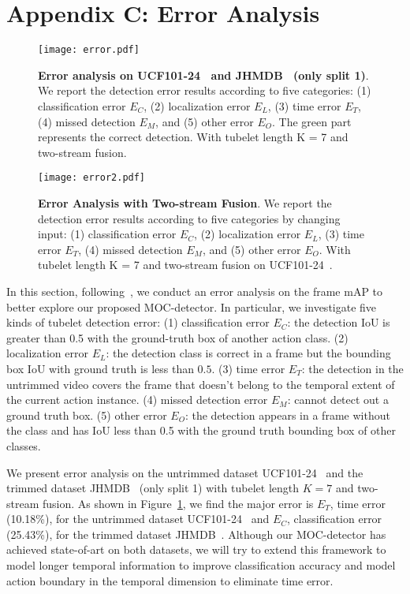 \documentclass[runningheads]{llncs}
\begin{document}
\section*{Appendix C: Error Analysis}
\begin{figure}
    \centering
      \texttt{[image: error.pdf]}
      \caption{{\bf Error analysis on UCF101-24~\cite{UCF101} and JHMDB~\cite{JHMDB} (only split 1)}. We report the detection error results according to
      five categories: (1) classification error $E_C$, (2) localization error $E_L$, (3) time error $E_T$, (4) missed detection $E_M$, and (5) other error $E_O$. The green part represents the correct detection. With tubelet length K = 7 and two-stream fusion.
       }
    \label{fig:error}
\end{figure}
\begin{figure}
\centering
    \texttt{[image: error2.pdf]}
    \caption{{\bf Error Analysis with Two-stream Fusion}. We report the detection error results according to five categories by changing input: (1) classification error $E_C$, (2) localization error $E_L$, (3) time error $E_T$, (4) missed detection $E_M$, and (5) other error $E_O$. With tubelet length K = 7 and two-stream fusion on UCF101-24~\cite{UCF101}.}
    \label{fig:error-fusion}
\end{figure}
In this section, following~\cite{kalogeiton2017action}, we conduct an error analysis on the frame mAP to better explore our proposed MOC-detector. In particular, we investigate five kinds of tubelet detection error: (1) classification error $E_C$: the detection IoU is greater than 0.5 with the ground-truth box of another action class. (2) localization error $E_L$: the detection class is correct in a frame but the bounding box IoU with ground truth is less than $0.5$. (3) time error $E_T$: the detection in the untrimmed video covers the frame that doesn't belong to the temporal extent of the current action instance. (4) missed detection error $E_M$: cannot detect out a ground truth box. (5) other error $E_O$: the detection appears in a frame without the class and has IoU less than 0.5 with the ground truth bounding box of other classes.

We present error analysis on the untrimmed dataset UCF101-24~\cite{UCF101} and the trimmed dataset JHMDB~\cite{JHMDB} (only split 1) with tubelet length $K=7$ and two-stream fusion. As shown in Figure~\ref{fig:error}, we find the major error is $E_T$, time error (10.18\%), for the untrimmed dataset UCF101-24~\cite{UCF101} and $E_C$, classification error (25.43\%), for the trimmed dataset JHMDB~\cite{JHMDB}. Although our MOC-detector has achieved state-of-art on both datasets, we will try to extend this framework to model longer temporal information to improve classification accuracy and model action boundary in the temporal dimension to eliminate time error.
\end{document}
